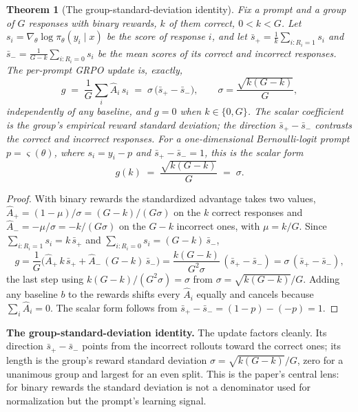 \documentclass[11pt]{article}
\theoremstyle{plain}
\newtheorem{theorem}{Theorem}
\theoremstyle{definition}
\newcommand{\Adv}{\hat{A}}
\begin{document}
\begin{theorem}[The group-standard-deviation identity]
\label{thm:identity}
Fix a prompt and a group of $G$ responses with binary rewards, $k$ of them correct, $0<k<G$. Let $s_i=\nabla_\theta\log\pi_\theta(y_i\mid x)$ be the score of response $i$, and let $\bar s_+=\frac1k\sum_{i:R_i=1}s_i$ and $\bar s_-=\frac1{G-k}\sum_{i:R_i=0}s_i$ be the mean scores of its correct and incorrect responses. The per-prompt GRPO update is, exactly,
\begin{equation}
\label{eq:exact}
g\;=\;\frac1G\sum_i \Adv_i\,s_i\;=\;\sigma\,\big(\bar s_+-\bar s_-\big),
\qquad \sigma=\frac{\sqrt{k(G-k)}}{G},
\end{equation}
\emph{independently of any baseline}, and $g=0$ when $k\in\{0,G\}$. The scalar coefficient is the group's empirical reward standard deviation; the direction $\bar s_+-\bar s_-$ contrasts the correct and incorrect responses. For a one-dimensional Bernoulli-logit prompt $p=\varsigma(\theta)$, where $s_i=y_i-p$ and $\bar s_+-\bar s_-=1$, this is the scalar form
\begin{equation}
\label{eq:scalar}
g(k)\;=\;\frac{\sqrt{k(G-k)}}{G}\;=\;\sigma .
\end{equation}
\end{theorem}

\begin{proof}
With binary rewards the standardized advantage takes two values, $\Adv_+=(1-\mu)/\sigma=(G-k)/(G\sigma)$ on the $k$ correct responses and $\Adv_-=-\mu/\sigma=-k/(G\sigma)$ on the $G-k$ incorrect ones, with $\mu=k/G$. Since $\sum_{i:R_i=1}s_i=k\,\bar s_+$ and $\sum_{i:R_i=0}s_i=(G-k)\,\bar s_-$,
\[
g=\frac1G\big(\Adv_+\,k\,\bar s_+ + \Adv_-\,(G-k)\,\bar s_-\big)
=\frac{k(G-k)}{G^2\sigma}\,(\bar s_+-\bar s_-)
=\sigma\,(\bar s_+-\bar s_-),
\]
the last step using $k(G-k)/(G^2\sigma)=\sigma$ from $\sigma=\sqrt{k(G-k)}/G$. Adding any baseline $b$ to the rewards shifts every $\Adv_i$ equally and cancels because $\sum_i\Adv_i=0$. The scalar form follows from $\bar s_+-\bar s_-=(1-p)-(-p)=1$.
\end{proof}

\begin{takeaway}
\textbf{The group-standard-deviation identity.} The update factors cleanly. Its direction $\bar s_+-\bar s_-$ points from the incorrect rollouts toward the correct ones; its length is the group's reward standard deviation $\sigma=\sqrt{k(G-k)}/G$, zero for a unanimous group and largest for an even split. This is the paper's central lens: for binary rewards the standard deviation is not a denominator used for normalization but the prompt's learning signal.
\end{takeaway}
\end{document}
